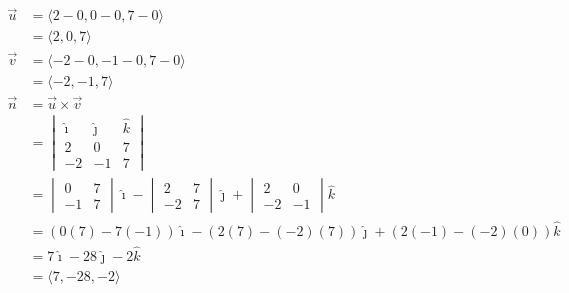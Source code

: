 \begin{align*}
    \vec{u} & = \langle 2 - 0, 0 - 0, 7 - 0 \rangle                                                  \\
            & = \langle 2, 0, 7 \rangle                                                              \\
    \vec{v} & = \langle -2 - 0, -1 - 0, 7 - 0 \rangle                                                \\
            & = \langle -2, -1, 7 \rangle                                                            \\
    \vec{n} & = \vec{u} \times \vec{v}                                                               \\
            & = \begin{vmatrix}
                    \hat{\imath} & \hat{\jmath} & \hat{k} \\
                    2            & 0            & 7       \\
                    -2           & -1           & 7
                \end{vmatrix}                            \\
            & = \begin{vmatrix}
                    0  & 7 \\
                    -1 & 7
                \end{vmatrix}\hat{\imath} - \begin{vmatrix}
                                                2  & 7 \\
                                                -2 & 7
                                            \end{vmatrix}\hat{\jmath} + \begin{vmatrix}
                                                                            2  & 0  \\
                                                                            -2 & -1
                                                                        \end{vmatrix}\hat{k}         \\
            & = (0(7) - 7(-1))\hat{\imath} - (2(7) - (-2)(7))\hat{\jmath} + (2(-1) - (-2)(0))\hat{k} \\
            & = 7\hat{\imath} - 28\hat{\jmath} - 2\hat{k}                                            \\
            & = \langle 7, -28, -2 \rangle
\end{align*}
